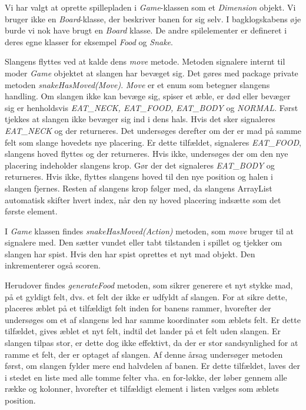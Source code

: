 Vi har valgt at oprette spillepladen i \textit{Game}-klassen som et \textit{Dimension} objekt. Vi bruger ikke en \textit{Board}-klasse, der beskriver banen for sig selv. I bagklogskabens øje burde vi nok have brugt en \textit{Board} klasse. De andre spilelementer er defineret i deres egne klasser for eksempel \textit{Food} og \textit{Snake}.

Slangens flyttes ved at kalde dens \textit{move} metode. Metoden signalere internt til moder \textit{Game} objektet at slangen har bevæget sig. Det gøres med package private metoden \textit{snakeHasMoved(Move)}. \textit{Move} er et enum som betegner slangens handling. Om slangen ikke kan bevæge sig, spiser et æble, er død eller bevæger sig er henholdsvis \textit{EAT\_NECK, EAT\_FOOD, EAT\_BODY} og \textit{NORMAL}. Først tjekkes at slangen ikke bevæger sig ind i dens hals. Hvis det sker signaleres \textit{EAT\_NECK} og der returneres. Det undersøges derefter om der er mad på samme felt som slange hovedets nye placering. Er dette tilfældet, signaleres \textit{EAT\_FOOD}, slangens hoved flyttes og der returneres. Hvis ikke, undersøges der om den nye placering indeholder slangens krop. Gør der det signaleres \textit{EAT\_BODY} og returneres. Hvis ikke, flyttes slangens hoved til den nye position og halen i slangen fjernes. Resten af slangens krop følger med, da slangens ArrayList automatisk skifter hvert index, når den ny hoved placering indsætte som det første element.

I \textit{Game} klassen findes \textit{snakeHasMoved(Action)} metoden, som \textit{move} bruger til at signalere med. Den sætter vundet eller tabt tilstanden i spillet og tjekker om slangen har spist. Hvis den har spist oprettes et nyt mad objekt. Den inkrementerer også scoren. 

Herudover findes \textit{generateFood} metoden, som sikrer generere et nyt stykke mad, på et gyldigt felt, dvs. et felt der ikke er udfyldt af slangen. For at sikre dette, placeres æblet på et tilfældigt felt inden for banens rammer, hvorefter der undersøges om et af slangens led har samme koordinater som æblets felt. Er dette tilfældet, gives æblet et nyt felt, indtil det lander på et felt uden slangen. Er slangen tilpas stor, er dette dog ikke effektivt, da der er stor sandsynlighed for at ramme et felt, der er optaget af slangen. Af denne årsag undersøger metoden først, om slangen fylder mere end halvdelen af banen. Er dette tilfældet, laves der i stedet en liste med alle tomme felter vha. en for-løkke, der løber gennem alle række og kolonner, hvorefter et tilfældigt element i listen vælges som æblets position.

